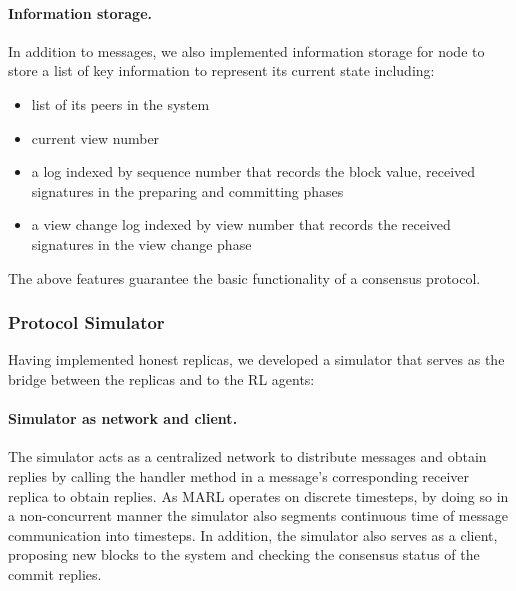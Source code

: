 \documentclass[a4paper,11pt]{article}
\begin{document}
\paragraph{Information storage.} In addition to messages, we also implemented information storage for node to store a list of key information to represent its current state including:
\begin{itemize}
    \item list of its peers in the system
    \item current view number
    \item a log indexed by sequence number that records the block value, received signatures in the preparing and committing phases
    \item a view change log indexed by view number that records the received signatures in the view change phase
\end{itemize}
The above features guarantee the basic functionality of a consensus protocol.
\subsubsection{Protocol Simulator}
Having implemented honest replicas, we developed a simulator that serves as the bridge between the replicas and to the RL agents:
\paragraph{Simulator as network and client.}
The simulator acts as a centralized network to distribute messages and obtain replies by calling the handler method in a message's corresponding receiver replica to obtain replies. As MARL operates on discrete timesteps, by doing so in a non-concurrent manner the simulator also segments continuous time of message communication into timesteps. In addition, the simulator also serves as a client, proposing new blocks to the system and checking the consensus status of the commit replies.
\end{document}
